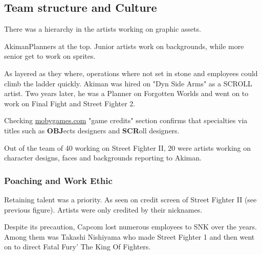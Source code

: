\pagebreak

\subsection{Team structure and Culture}

There was a hierarchy in the artists working on graphic assets. 

\begin{q}{Akiman\cite{akiman2003}}Planners at the top. Junior artists work on backgrounds, while more senior get to work on sprites.
\end{q}

As layered as they where, operations where not set in stone and employees could climb the ladder quickly. Akiman was hired on "Dyn Side Arms" as a SCROLL artist. Two years later, he was a Planner on Forgotten Worlds and went on to work on Final Fight and Street Fighter 2.


\begin{trivia}
Checking \url{mobygames.com} "game credits" section confirms that specialties via titles such as \textbf{OBJ}ects designers and \textbf{SCR}oll designers.
\end{trivia}

Out of the team of 40 working on Street Fighter II, 20 were artists working on character designs, faces and backgrounds reporting to Akiman\cite{sf2_oral_history}.



\subsubsection{Poaching and Work Ethic}
Retaining talent was a priority. As seen on credit screen of Street Fighter II (see previous figure). Artists were only credited by their nicknames.

Despite its precaution, Capcom lost numerous employees to SNK over the years. Among them was Takashi Nishiyama who made Street Fighter 1 and then went on to direct Fatal Fury' The King Of Fighters\cite{YoshikiOkamotoTakashiNishiyama}.
 


